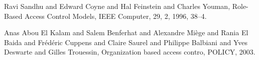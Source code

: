 \documentclass{acm_proc_article-sp}
\begin{document}
\begin{thebibliography}{1}
Ravi Sandhu and Edward Coyne and Hal Feinstein and Charles Youman,
Role-Based Access Control Models,
IEEE Computer,
29,
2,   
1996,
38--4.

Anas Abou El Kalam and
               Salem Benferhat and
               Alexandre Mi{\`e}ge and
               Rania El Baida and
               Fr{\'e}d{\'e}ric Cuppens and
               Claire Saurel and
               Philippe Balbiani and
               Yves Deswarte and
               Gilles Trouessin,
Organization based access contro,
POLICY,
2003.

\end{thebibliography}

\balancecolumns
\end{document}
